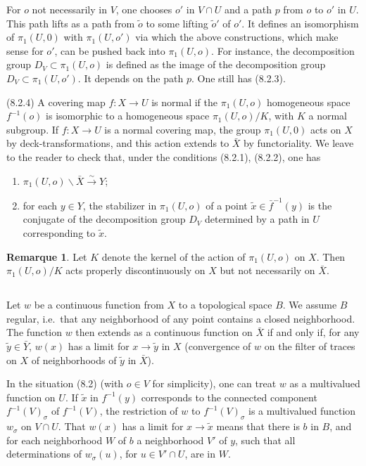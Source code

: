 \documentclass[12pt,a4paper]{article}
\theoremstyle{plain}
\theoremstyle{definition}
\newtheorem{remark}[theorem]{Remarque}
\theoremstyle{remark}
\numberwithin{equation}{section}
\begin{document}
For $o$ not necessarily in $V$, one chooses $o'$ in $V \cap U$ and a path $p$ from $o$ to $o'$ in $U$. This path lifts as a path from $\tilde{o}$ to some lifting $\tilde{o}'$ of $o'$. It defines an isomorphism of $\pi_1(U, 0)$ with $\pi_1(U, o')$ via which the above constructions, which make sense for $o'$, can be pushed back into $\pi_1(U, o)$. For instance, the decomposition group $D_V \subset \pi_1(U, o)$ is defined as the image of the decomposition group $D_V \subset \pi_1(U, o')$. It depends on the path $p$. One still has (8.2.3).

(8.2.4) A covering map $f: X \to U$ is normal if the $\pi_1(U, o)$ homogeneous space $f^{-1}(o)$ is isomorphic to a homogeneous space $\pi_1(U, o)/K$, with $K$ a normal subgroup. If $f: X \to U$ is a normal covering map, the group $\pi_1(U, 0)$ acts on $X$ by deck-transformations, and this action extends to $\bar{X}$ by functoriality. We leave to the reader to check that, under the conditions (8.2.1), (8.2.2), one has
\begin{enumerate}
\item $\pi_1(U, o) \backslash \bar{X} \xrightarrow{\sim} Y$;
\item for each $y \in Y$, the stabilizer in $\pi_1(U, o)$ of a point $\tilde{x} \in \bar{f}^{-1}(y)$ is the conjugate of the decomposition group $D_V$ determined by a path in $U$ corresponding to $\tilde{x}$.
\end{enumerate}

\begin{remark}
Let $K$ denote the kernel of the action of $\pi_1(U, o)$ on $X$. Then $\pi_1(U, o)/K$ acts properly discontinuously on $X$ but not necessarily on $\bar{X}$.
\end{remark}

\subsection{}
Let $w$ be a continuous function from $X$ to a topological space $B$. We assume $B$ regular, i.e.\ that any neighborhood of any point contains a closed neighborhood. The function $w$ then extends as a continuous function on $\bar{X}$ if and only if, for any $\tilde{y} \in \bar{Y}$, $w(x)$ has a limit for $x \to \tilde{y}$ in $X$ (convergence of $w$ on the filter of traces on $X$ of neighborhoods of $\tilde{y}$ in $\bar{X}$).

In the situation (8.2) (with $o \in V$ for simplicity), one can treat $w$ as a multivalued function on $U$. If $\tilde{x}$ in $f^{-1}(y)$ corresponds to the connected component $f^{-1}(V)_\sigma$ of $f^{-1}(V)$, the restriction of $w$ to $f^{-1}(V)_\sigma$ is a multivalued function $w_\sigma$ on $V \cap U$. That $w(x)$ has a limit for $x \to \tilde{x}$ means that there is $b$ in $B$, and for each neighborhood $W$ of $b$ a neighborhood $V'$ of $y$, such that all determinations of $w_\sigma(u)$, for $u \in V' \cap U$, are in $W$.
\end{document}
